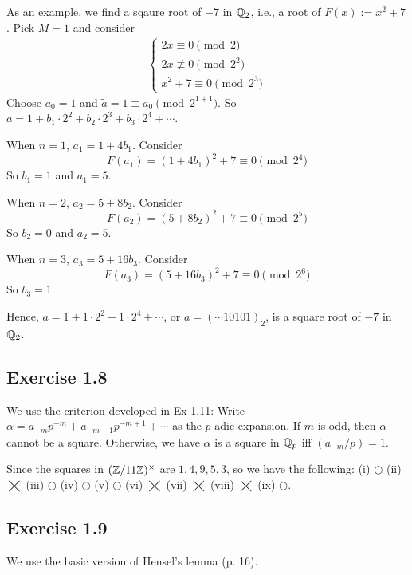 \documentclass[../Koblitz.tex]{subfiles}
\begin{document}
As an example, we find a sqaure root of $-7$ in $\mathbb{Q}_2$, i.e., a root of $F(x):=x^2+7$. Pick $M=1$ and consider
\begin{align*}
\begin{cases*}
2x\equiv 0 \pmod{2} \\
2x\not\equiv 0 \pmod{2^2} \\
x^2+7\equiv 0 \pmod{2^3}
\end{cases*}
\end{align*}
Choose $a_0=1$ and $\tilde{a}=1\equiv a_0 \pmod{2^{1+1}}$. So $a=1+b_1\cdot2^2+b_2\cdot2^3+b_3\cdot2^4+\cdots$.

When $n=1$, $a_1=1+4b_1$. Consider $$F(a_1)=(1+4b_1)^2+7\equiv 0\pmod{2^4}$$ So $b_1=1$ and $a_1=5$.

When $n=2$, $a_2=5+8b_2$. Consider $$F(a_2)=(5+8b_2)^2+7\equiv 0\pmod{2^5}$$ So $b_2=0$ and $a_2=5$.

When $n=3$, $a_3=5+16b_3$. Consider $$F(a_3)=(5+16b_3)^2+7\equiv 0\pmod{2^6}$$ So $b_3=1$.

Hence, $a=1+1\cdot2^2+1\cdot2^4+\cdots$, or $a=(\cdots10101)_2$, is a square root of $-7$ in $\mathbb{Q}_2$.

\subsection*{Exercise 1.8}

We use the criterion developed in Ex 1.11: Write $\alpha=a_{-m}p^{-m}+a_{-m+1}p^{-m+1}+\cdots$ as the $p$-adic expansion. If $m$ is odd, then $\alpha$ cannot be a square. Otherwise, we have $\alpha$ is a square in $\mathbb{Q}_p$ iff $(a_{-m}/p)=1$.

Since the squares in $(\mathbb{Z}/11\mathbb{Z})^\times$ are $1,4,9,5,3$, so we have the following: (i) $\bigcirc$ (ii) $\bigtimes$ (iii) $\bigcirc$ (iv) $\bigcirc$ (v) $\bigcirc$ (vi) $\bigtimes$ (vii) $\bigtimes$ (viii) $\bigtimes$ (ix) $\bigcirc$.

\subsection*{Exercise 1.9}

We use the basic version of Hensel's lemma (p. 16).
\end{document}
